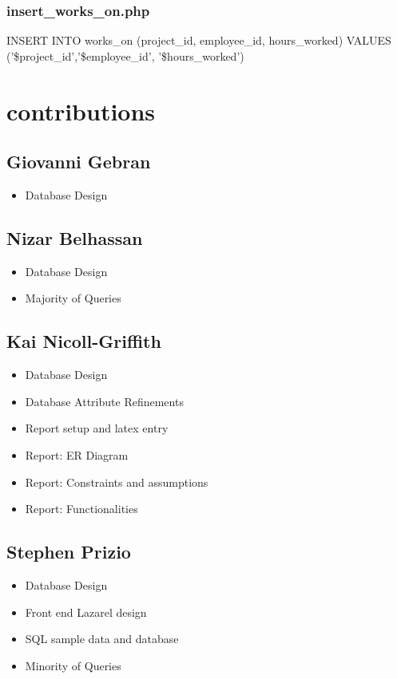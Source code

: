 \documentclass[11pt,letterpaper]{article}
\begin{document}
	\subsubsection{insert\_works\_on.php}
	INSERT INTO works\_on (project\_id, employee\_id, hours\_worked) VALUES ('\$project\_id','\$employee\_id', '\$hours\_worked')
	
\section{contributions}
\subsection{Giovanni Gebran}
 \begin{itemize}
\item Database Design
\end{itemize}
\subsection{Nizar Belhassan}
 \begin{itemize}
\item Database Design
\item Majority of Queries
\end{itemize}
\subsection{Kai Nicoll-Griffith}
 \begin{itemize}
\item Database Design
\item Database Attribute Refinements
\item Report setup and latex entry
\item Report: ER Diagram
\item Report: Constraints and assumptions
\item Report: Functionalities
\end{itemize}
\subsection{Stephen Prizio}
 \begin{itemize}
	\item Database Design
	\item Front end Lazarel design
	\item SQL sample data and database 
	\item Minority of Queries
\end{itemize}
\end{document}
